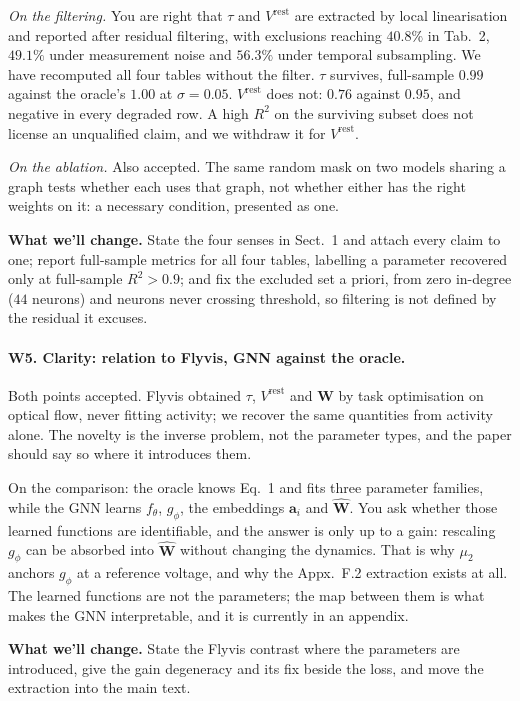 \documentclass[11pt]{article}
\newcommand{\Mat}[1]{\mathbf{#1}}
\begin{document}
\emph{On the filtering.} You are right that $\tau$ and $V^{\mathrm{rest}}$ are
extracted by local linearisation and reported after residual filtering, with
exclusions reaching $40.8\%$ in Tab.~2, $49.1\%$ under measurement noise and
$56.3\%$ under temporal subsampling. We have recomputed all four tables without
the filter. $\tau$ survives, full-sample $0.99$ against the oracle's $1.00$ at
$\sigma = 0.05$. $V^{\mathrm{rest}}$ does not: $0.76$ against $0.95$, and negative
in every degraded row. A high $R^2$ on the surviving subset does not license an
unqualified claim, and we withdraw it for $V^{\mathrm{rest}}$.

\emph{On the ablation.} Also accepted. The same random mask on two models sharing
a graph tests whether each uses that graph, not whether either has the right
weights on it: a necessary condition, presented as one.

\textbf{What we'll change.} State the four senses in Sect.~1 and attach every
claim to one; report full-sample metrics for all four tables, labelling a
parameter recovered only at full-sample $R^2 > 0.9$; and fix the excluded set a
priori, from zero in-degree ($44$ neurons) and neurons never crossing threshold,
so filtering is not defined by the residual it excuses.

\paragraph{W5. Clarity: relation to Flyvis, GNN against the oracle.}
Both points accepted. Flyvis obtained $\tau$, $V^{\mathrm{rest}}$ and $\Mat{W}$
by task optimisation on optical flow, never fitting activity; we recover the same
quantities from activity alone. The novelty is the inverse problem, not the
parameter types, and the paper should say so where it introduces them.

On the comparison: the oracle knows Eq.~1 and fits three parameter families,
while the GNN learns $f_\theta$, $g_\phi$, the embeddings $\Mat{a}_i$ and
$\widehat{\Mat{W}}$. You ask whether those learned functions are identifiable,
and the answer is only up to a gain: rescaling $g_\phi$ can be absorbed into
$\widehat{\Mat{W}}$ without changing the dynamics. That is why $\mu_2$ anchors
$g_\phi$ at a reference voltage, and why the Appx.~F.2 extraction exists at all.
The learned functions are not the parameters; the map between them is what makes
the GNN interpretable, and it is currently in an appendix.

\textbf{What we'll change.} State the Flyvis contrast where the parameters are
introduced, give the gain degeneracy and its fix beside the loss, and move the
extraction into the main text.
\end{document}
